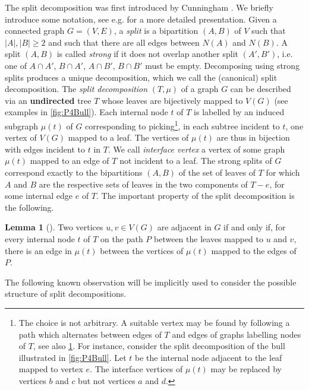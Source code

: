 \documentclass{amsart}
\theoremstyle{definition}
\newtheorem{lemma}{Lemma}
\begin{document}
The split decomposition was first introduced by Cunningham \cite{SplitDecIntro}.
We briefly introduce some notation, see e.g. \cite{GioanP12} for a more
detailed presentation.
Given a connected graph $G=(V,E)$, a \emph{split} is a
bipartition $(A,B)$ of $V$ such that $|A|,|B| \geq 2$ and such that there are
all edges between $N(A)$ and $N(B)$. A split $(A,B)$ is called \emph{strong} if
it does not overlap another split $(A',B')$, i.e. one of $A \cap A'$, $B \cap
A'$, $A \cap B'$, $B \cap B'$ must be empty. Decomposing using strong splits
produces a unique decomposition, which we call the (canonical) split
decomposition. The \emph{split decomposition} $(T,\mu)$ of a graph $G$ can be
described via an \textbf{undirected} tree $T$ whose leaves are bijectively
mapped to $V(G)$ (see examples in \cref{fig:P4Bull}).
Each internal node $t$ of $T$ is labelled by an induced
subgraph $\mu(t)$ of $G$ corresponding to picking\footnote{The choice is not
arbitrary. A suitable vertex may be found by following a path which alternates
between edges of $T$ and edges of graphs labelling nodes of $T$, see also
\cref{lem:adj-split-dec}. For instance, consider the split decomposition of the
bull illustrated in \cref{fig:P4Bull}. Let $t$ be the internal node adjacent to
the leaf mapped to vertex $e$. The interface vertices of $\mu(t)$ may be
replaced by vertices $b$ and $c$ but not vertices $a$ and $d$.},
in each subtree incident to $t$, one vertex of $V(G)$ mapped to a leaf.
The vertices of $\mu(t)$ are thus in bijection with edges incident to $t$ in
$T$. We call \emph{interface vertex} a vertex of some graph $\mu(t)$ mapped
to an edge of $T$ not incident to a leaf. 
The strong splits of $G$ correspond exactly to the bipartitions $(A,B)$ of the
set of leaves of $T$ for which $A$ and $B$ are the respective sets of leaves in 
the two components of $T-e$, for some internal edge $e$ of $T$.
The important property of the split decomposition is the following.

\begin{lemma}[\cite{GioanP12}]\label{lem:adj-split-dec}
	Two vertices $u,v \in V(G)$ are adjacent in $G$ if and only if, for every
	internal node $t$ of $T$ on the path $P$ between the leaves mapped to $u$ and
	$v$, there is an edge in $\mu(t)$ between the vertices of $\mu(t)$ mapped
	to the edges of $P$.
\end{lemma}

The following known observation will be implicitly used to consider the
possible structure of split decompositions.
\end{document}
